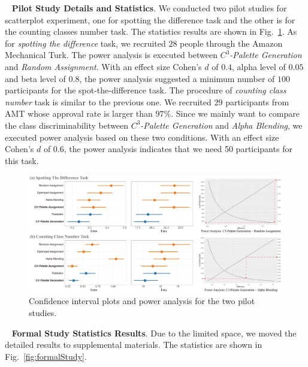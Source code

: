 \documentclass[review,onecolumn]{vgtc}                %
\newcommand{\myparagraph}[1]{\mbox{\ } \newline \noindent \textbf{#1}}
\renewcommand{\paragraph}[1]{\myparagraph{#1}}
\begin{document}
\paragraph{Pilot Study Details and Statistics}.
We conducted two pilot studies for scatterplot experiment, one for spotting the difference task and the other is for the counting classes number task. The statistics results are shown in Fig.~\ref{fig:pilotResults}.
As for \emph{spotting the difference} task, we recruited $28$ people through the Amazon Mechanical Turk. The power analysis is executed between \emph{$C^3$-Palette Generation} and \emph{Random Assignment}. With an effect size Cohen's $d$ of $0.4$, alpha level of $0.05$ and beta level of $0.8$, the power analysis suggested a minimum number of $100$ participants for the spot-the-difference task.
The procedure of \emph{counting class number} task is similar to the previous one. We recruited 29 participants from AMT whose approval rate is larger than $97\%$. Since we mainly want to compare the class discriminability between \emph{$C^3$-Palette Generation} and \emph{Alpha Blending}, we executed power analysis based on these two conditions.  With an effect size Cohen's $d$ of $0.6$, the power analysis indicates that we need 50 participants for this task.

\begin{figure}[h]
\centering
\includegraphics[width=1\linewidth]{user-result-pilot.pdf}
\caption{Confidence interval plots and power analysis for the two pilot studies.
}
\vspace*{-5mm}
\label{fig:pilotResults}
\end{figure}


\paragraph{Formal Study Statistics Results}.
Due to the limited space, we moved the detailed results to supplemental materials. The statistics are shown in Fig.~\ref{fig:formalStudy}.
\end{document}

